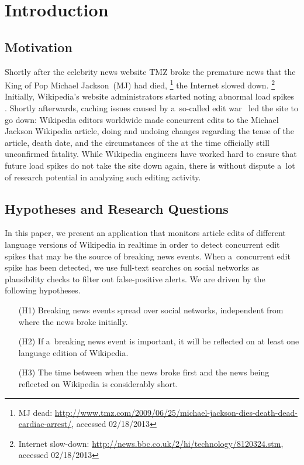 \documentclass{sig-alternate}
\newcommand{\inlinelistingsize}{\fontsize{8pt}{11pt}}
\let\oldurl\url
\renewcommand{\url}[1]{\inlinelistingsize\oldurl{#1}}
\begin{document}



\section{Introduction}

\subsection{Motivation}

Shortly after the celebrity news website TMZ
broke the premature news that the King of Pop Michael Jackson~(MJ) had died,%
\footnote{MJ dead: \url{http://www.tmz.com/2009/06/25/michael-jackson-dies-death-dead-cardiac-arrest/},
accessed 02/18/2013}
the Internet slowed down.%
\footnote{Internet slow-down: \url{http://news.bbc.co.uk/2/hi/technology/8120324.stm}, accessed 02/18/2013}
Initially, Wikipedia's website administrators started noting abnormal load spikes~%
\cite{vibber2009currentevents}. Shortly afterwards, caching issues
caused by a~so-called edit war~\cite{beaumont2009editwar} led the site to go down:
Wikipedia editors worldwide made concurrent edits
to the Michael Jackson Wikipedia article, doing and undoing changes
regarding the tense of the article, death date,
and the circumstances of the at the time officially still unconfirmed fatality.
While Wikipedia engineers have worked hard
to ensure that future load spikes
do not take the site down again, there is without dispute a~lot of research potential
in analyzing such editing activity.

\subsection{Hypotheses and Research Questions}

In this paper, we present an application that monitors article edits
of different language versions of Wikipedia in realtime
in order to detect concurrent edit spikes that may be the source of
breaking news events.
When a~concurrent edit spike has been detected,
we use full-text searches on social networks
as plausibility checks to filter out false-positive alerts.
We are driven by the following hypotheses.

\begin{itemize}
  \itemsep0em
  \item[(H1)] Breaking news events spread over social networks,
    independent from where the news broke initially.
  \item[(H2)] If a~breaking news event is important, it will be reflected on
    at least one language edition of Wikipedia.
  \item[(H3)] The time between when the news broke first and the news
    being reflected on Wikipedia is considerably short.   
\end{itemize}
\end{document}
